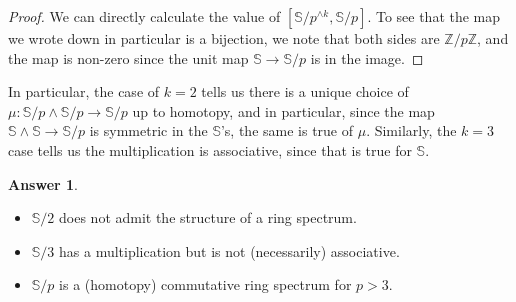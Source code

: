 \documentclass{shortart}
\theoremstyle{definition}
\newtheorem*{ans}{Answer}
\renewcommand\S{\mathbb{S}}
\newcommand\Z{\mathbb{Z}}
\begin{document}
\begin{proof}
  We can directly calculate the value of $[\S/p^{\wedge k}, \S/p]$. To see that the map we wrote down in particular is a bijection, we note that both sides are $\Z/p\Z$, and the map is non-zero since the unit map $\S \to \S/p$ is in the image.
\end{proof}
In particular, the case of $k = 2$ tells us there is a unique choice of $\mu: \S/p \wedge \S/p \to \S/p$ up to homotopy, and in particular, since the map $\S \wedge \S \to \S/p$ is symmetric in the $\S$'s, the same is true of $\mu$. Similarly, the $k = 3$ case tells us the multiplication is associative, since that is true for $\S$.

\begin{ans}\leavevmode
  \begin{itemize}
    \item $\S/2$ does not admit the structure of a ring spectrum.
    \item $\S/3$ has a multiplication but is not (necessarily) associative.
    \item $\S/p$ is a (homotopy) commutative ring spectrum for $p > 3$.
  \end{itemize}
\end{ans}
\end{document}
